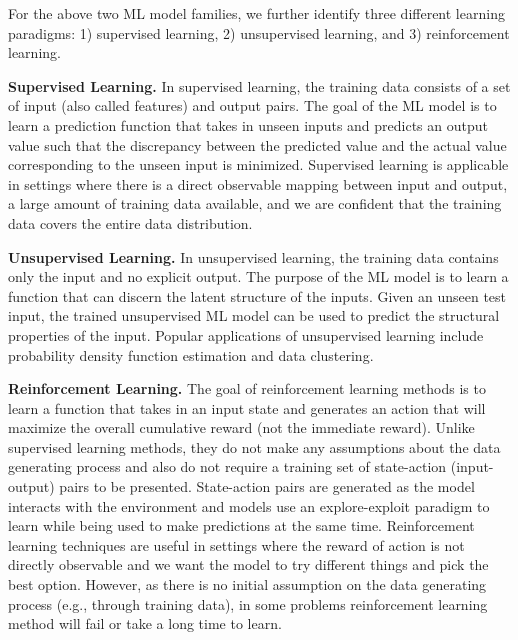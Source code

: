 For the above two ML model families, we further identify three different learning paradigms: 1) supervised learning, 2) unsupervised learning, and 3) reinforcement learning.

\vspace{2mm}
\noindent \textbf{Supervised Learning. } In supervised learning, the training data consists of a set of input (also called features) and output pairs.
The goal of the ML model is to learn a prediction function that takes in unseen inputs and predicts an output value such that the discrepancy between the predicted value and the actual value corresponding to the unseen input is minimized.
Supervised learning is applicable in settings where there is a direct observable mapping between input and output, a large amount of training data available, and we are confident that the training data covers the entire data distribution.

\vspace{2mm}
\noindent \textbf{Unsupervised Learning. } In unsupervised learning, the training data contains only the input and no explicit output.
The purpose of the ML model is to learn a function that can discern the latent structure of the inputs.
Given an unseen test input, the trained unsupervised ML model can be used to predict the structural properties of the input.
Popular applications of unsupervised learning include probability density function estimation and data clustering.

\vspace{2mm}
\noindent \textbf{Reinforcement Learning. } The goal of reinforcement learning methods is to learn a function that takes in an input state and generates an action that will maximize the overall cumulative reward (not the immediate reward).
Unlike supervised learning methods, they do not make any assumptions about the data generating process and also do not require a training set of state-action (input-output) pairs to be presented.
State-action pairs are generated as the model interacts with the environment and models use an explore-exploit paradigm to learn while being used to make predictions at the same time.
Reinforcement learning techniques are useful in settings where the reward of action is not directly observable and we want the model to try different things and pick the best option.
However, as there is no initial assumption on the data generating process (e.g., through training data), in some problems reinforcement learning method will fail or take a long time to learn.